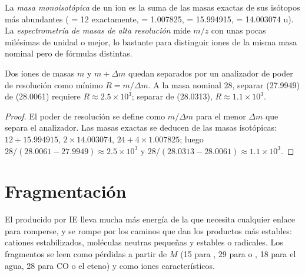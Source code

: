 \begin{definition}\label{def:b2:mass-spec-atomic:exact-mass}
La \emph{masa monoisotópica} de un ion es la suma de las masas exactas de sus
isótopos más abundantes ( = 12 exactamente,  = 1.007825,  = 15.994915,
 = 14.003074 u). La \emph{espectrometría de masas de alta resolución}
mide $m/z$ con unas pocas milésimas de unidad o mejor, lo bastante para distinguir iones de la misma
masa nominal pero de fórmulas distintas.
\end{definition}

\begin{proposition}\label{prop:b2:mass-spec-atomic:resolving}
Dos iones de masas $m$ y $m + \Delta m$ quedan separados por un analizador de poder de resolución como mínimo
$R = m/\Delta m$. A la masa nominal 28, separar  (27.9949) de  (28.0061) requiere $R
\approx 2.5 \times 10^3$; separar  de  (28.0313), $R \approx 1.1 \times 10^3$.
\end{proposition}

\begin{proof}
El poder de resolución se define como $m/\Delta m$ para el menor $\Delta m$ que separa el analizador. Las
masas exactas se deducen de las masas isotópicas: $12 + 15.994915$, $2 \times 14.003074$, $24 + 4 \times
1.007825$; luego $28/(28.0061 - 27.9949) \approx 2.5 \times 10^3$ y $28/(28.0313 - 28.0061) \approx
1.1 \times 10^3$.
\end{proof}

\section{Fragmentación}

El  producido por IE lleva mucha más energía de la que necesita cualquier enlace para romperse, y se rompe por
los caminos que dan los productos más estables: cationes estabilizados, moléculas neutras pequeñas y estables o
radicales. Los fragmentos se leen como pérdidas a partir de $M$ (15 para , 29 para  o , 18
para el agua, 28 para CO o el eteno) y como iones característicos.

